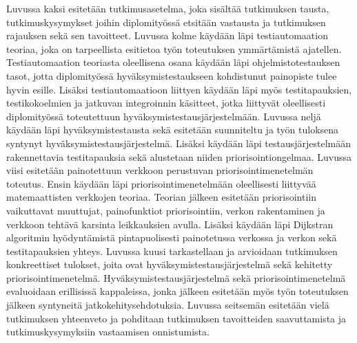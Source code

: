 Luvussa kaksi esitetään tutkimusasetelma, joka sisältää tutkimuksen tausta, tutkimuskysymykset joihin diplomityössä etsitään vastausta ja tutkimuksen rajauksen sekä sen tavoitteet.
Luvussa kolme käydään läpi testiautomaation teoriaa, joka on tarpeellista esitietoa työn toteutuksen ymmärtämistä ajatellen.
Testiautomaation teoriasta oleellisena osana käydään läpi ohjelmistotestauksen tasot, jotta diplomityössä hyväksymistestaukseen kohdistunut painopiste tulee hyvin esille.
Lisäksi testiautomaatioon liittyen käydään läpi myös testitapauksien, testikokoelmien ja jatkuvan integroinnin käsitteet, jotka liittyvät oleellisesti diplomityössä toteutettuun hyväksymistestausjärjestelmään.
Luvussa neljä käydään läpi hyväksymistestausta sekä esitetään suunniteltu ja työn tuloksena syntynyt hyväksymistestausjärjestelmä.
Lisäksi käydään läpi testausjärjestelmään rakennettavia testitapauksia sekä alustetaan niiden priorisointiongelmaa.
Luvussa viisi esitetään painotettuun verkkoon perustuvan priorisointimenetelmän toteutus.
Ensin käydään läpi priorisointimenetelmään oleellisesti liittyvää matemaattisten verkkojen teoriaa.
Teorian jälkeen esitetään priorisointiin vaikuttavat muuttujat, painofunktiot priorisointiin, verkon rakentaminen ja verkkoon tehtävä karsinta leikkauksien avulla.
Lisäksi käydään läpi Dijkstran algoritmin hyödyntämistä pintapuolisesti painotetussa verkossa ja verkon sekä testitapauksien yhteys.
Luvussa kuusi tarkastellaan ja arvioidaan tutkimuksen konkreettiset tulokset, joita ovat hyväksymistestausjärjestelmä sekä kehitetty priorisointimenetelmä.
Hyväksymistestausjärjestelmä sekä priorisointimenetelmä evaluoidaan erillisissä kappaleissa, jonka jälkeen esitetään myös työn toteutuksen jälkeen syntyneitä jatkokehitysehdotuksia.
Luvussa seitsemän esitetään vielä tutkimuksen yhteenveto ja pohditaan tutkimuksen tavoitteiden saavuttamista ja tutkimuskysymyksiin vastaamisen onnistumista.
